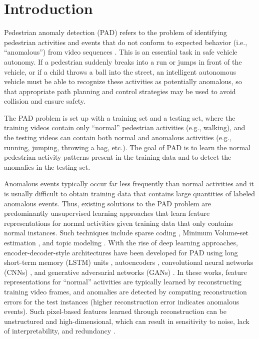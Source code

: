 \documentclass[nohyperref]{article}
\theoremstyle{plain}
\theoremstyle{definition}
\theoremstyle{remark}
\begin{document}
\vspace{-8mm}

\section{Introduction}
\label{introduction}
Pedestrian anomaly detection (PAD) refers to the problem of identifying pedestrian activities and events that do not conform to expected behavior (i.e., ``anomalous'') from video sequences \cite{li2013anomaly,andrews2016transfer, deecke2021transfer}. This is an essential task in safe vehicle autonomy. If a pedestrian suddenly breaks into a run or jumps in front of the vehicle, or if a child throws a ball into the street, an intelligent autonomous vehicle must be able to recognize these activities as potentially anomalous, so that appropriate path planning and control strategies may be used to avoid collision and ensure safety. 

\vspace{-1mm}

The PAD problem is set up with a training set and a testing set, where the training videos contain only “normal” pedestrian activities (e.g., walking), and the testing videos can contain both normal
and anomalous activities (e.g., running, jumping, throwing a bag, etc.). The goal of PAD is to learn the normal pedestrian activity patterns present in the training data and to detect the
anomalies in the testing set.

\vspace{-1mm}

Anomalous events typically occur far less frequently than normal activities \cite{sultani2018real} and it is usually difficult to obtain training data that contains large quantities of labeled anomalous events. Thus, existing solutions to the PAD problem are predominantly  unsupervised learning approaches that learn feature representations for normal activities given training data that only contains normal instances. Such techniques include sparse coding \cite{cewu2013}, Minimum Volume-set estimation \cite{thomas2016learning, thomas2017anomaly}, and topic modeling \cite{isupova2016anomaly, girdhar2016anomaly}. With the rise of deep learning approaches, encoder-decoder-style architectures have been developed for PAD using long short-term memory (LSTM) units \cite{srivastava2015unsupervised}, autoencoders \cite{hasan2016learning,chong2017abnormal, luo2017revisit}, convolutional neural networks (CNNs) \cite{nguyen2019anomaly}, and generative adversarial networks (GANs)  \cite{ravanbakhsh2017abnormal, chen2021nm}. In these works, feature representations for ``normal'' activities are typically learned by reconstructing training video frames, and anomalies are detected by computing reconstruction errors for the test instances (higher reconstruction error indicates anomalous events). Such pixel-based
features learned through reconstruction can be unstructured and high-dimensional, which can result in sensitivity to noise, lack of interpretability, and redundancy \cite{morais2019learning}. 
\end{document}
